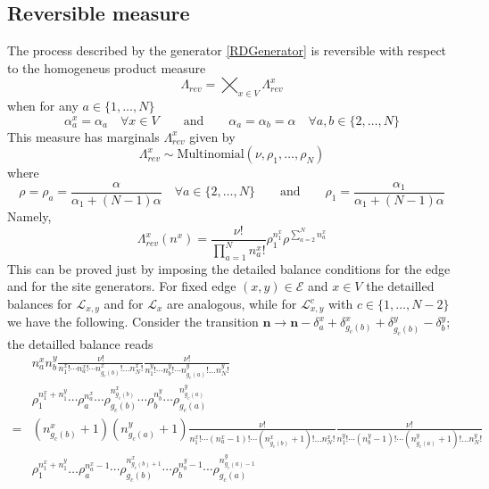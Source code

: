 \documentclass[10pt]{article}
\numberwithin{equation}{section}
\numberwithin{equation}{subsection}
\newcommand{\twoj}{\nu}
\begin{document}
\subsection{Reversible measure} 
The process described by the generator \eqref{RDGenerator} is reversible with respect to the homogeneus product measure \begin{equation}\label{reversibleMeasureRD}
	\Lambda_{rev}=\bigtimes_{x\in V}\Lambda_{rev}^{x}
\end{equation}
when for any $a\in\{1,\ldots,N\}$
\begin{equation}\label{reversibilityConditionRD}
	\alpha_{a}^{x}=\alpha_{a}\quad \forall x\in V\qquad\text{and}\qquad \alpha_{a}=\alpha_{b}=\alpha \quad \forall a,b\in \{2,\ldots,N\}
\end{equation}
This measure has marginals $\Lambda_{rev}^{x}$ given by 
\begin{equation}
	\Lambda^{x}_{rev}\sim \text{Multinomial}\left(\twoj,\rho_{1},\ldots,\rho_{N}\right)
\end{equation}
where 
\begin{equation}
	\rho=\rho_{a}=\frac{\alpha}{\alpha_{1}+(N-1)\alpha}\quad \forall a\in \{2,\ldots,N\}\qquad \text{and}\qquad \rho_{1}=\frac{\alpha_{1}}{\alpha_{1}+(N-1)\alpha}
\end{equation}
Namely,
\begin{equation}
	\Lambda_{rev}^{x}(n^{x})=\frac{\nu!}{\prod_{a=1}^{N}n_{a}^{x}!}\rho_{1}^{n_{1}^{x}}\rho^{\sum_{a=2}^{N}n_{a}^{x}}
\end{equation}
This can be proved just by imposing the detailed balance conditions for the edge and for the site generators. For fixed edge $(x,y)\in \mathcal{E}$ and $x\in V$ the detailled balances for $\mathcal{L}_{x,y}$ and for $\mathcal{L}_{x}$ are analogous, while for $\mathcal{L}_{x,y}^{c}$ with $c\in\{1,\ldots,N-2\}$ we have the following. Consider the transition $\bm{n}\to \bm{n}-\delta_{a}^{x}+\delta_{g_{c}(b)}^{x}+\delta_{g_{c}(b)}^{y}-\delta_{b}^{y}$; the detailled balance reads
\begin{equation}
	\begin{split}
		&n_{a}^{x}n_{b}^{y}\frac{\nu!}{n_{1}^{x}!\cdots n_{a}^{x}!\cdots n_{g_{c}(b)}^{x}!\ldots n_{N}^{x}!}\frac{\nu!}{n_{1}^{y}!\cdots n_{b}^{y}!\cdots n_{g_{c}(a)}^{y}!\ldots n_{N}^{y}!}\\&\rho_{1}^{n_{1}^{x}+n_{1}^{y}}\cdots \rho_{a}^{n_{a}^{x}}\cdots\rho_{g_{c}(b)}^{n_{g_{c}(b)}^{x}}\cdots\rho_{b}^{n_{b}^{y}}\cdots \rho_{g_{c}(a)}^{n_{g_{c}(a)}^{y}}
		\\
		=&(n_{g_{c}(b)}^{x}+1)(n_{g_{c}(a)}^{y}+1)\frac{\nu!}{n_{1}^{x}!\cdots (n_{a}^{x}-1)!\cdots (n_{g_{c}(b)}^{x}+1)!\ldots n_{N}^{x}!}\frac{\nu!}{n_{1}^{y}!\cdots (n_{b}^{y}-1)!\cdots (n_{g_{c}(a)}^{y}+1)!\ldots n_{N}^{y}!}
		\\&
		\rho_{1}^{n_{1}^{x}+n_{1}^{y}}\ldots \rho_{a}^{n_{a}^{x}-1}\cdots\rho_{g_{c}(b)}^{n_{g_{c}(b)+1}^{x}}\cdots\rho_{b}^{n_{b}^{y}-1}\cdots \rho_{g_{c}(a)}^{n_{g_{c}(a)-1}^{y}}
	\end{split}
\end{equation}
\end{document}
